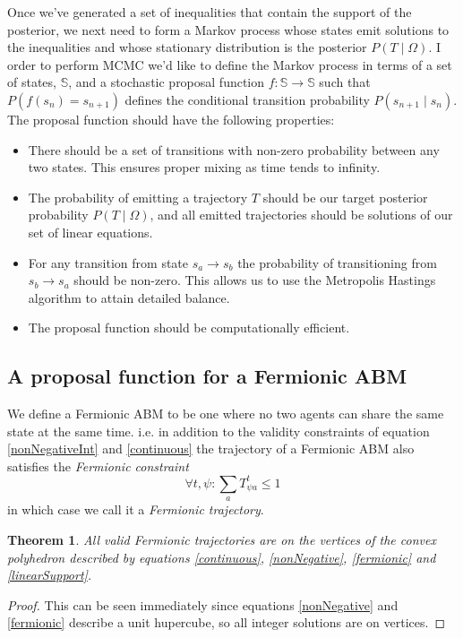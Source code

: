 \documentclass{article}
\newtheorem{theorem}{Theorem}
\begin{document}
Once we've generated a set of inequalities that contain the support of the posterior, we next need to form a Markov process whose states emit solutions to the inequalities and whose stationary distribution is the posterior $P(T \mid \Omega)$. I order to perform MCMC we'd like to define the Markov process in terms of a set of states, $\mathbb{S}$, and a stochastic proposal function $f:\mathbb{S} \to \mathbb{S}$ such that $P(f(s_n) = s_{n+1})$ defines the conditional transition probability $P(s_{n+1} \mid s_n)$. The proposal function should have the following properties:
\begin{itemize}
\item There should be a set of transitions with non-zero probability between any two states. This ensures proper mixing as time tends to infinity.

\item The probability of emitting a trajectory $T$ should be our target posterior probability $P(T \mid \Omega)$, and all emitted trajectories should be solutions of our set of linear equations.

\item For any transition from state $s_a \to s_b$ the probability of transitioning from $s_b \to s_a$ should be non-zero. This allows us to use the Metropolis Hastings algorithm to attain detailed balance.

\item The proposal function should be computationally efficient. 
\end{itemize}

\subsection{A proposal function for a Fermionic ABM}

We define a Fermionic ABM to be one where no two agents can share the same state at the same time. i.e. in addition to the validity constraints of equation \ref{nonNegativeInt} and \ref{continuous} the trajectory of a Fermionic ABM also satisfies the \textit{Fermionic constraint}
\begin{equation}
\forall t,\psi: \sum_a T^t_{\psi a} \le 1
\label{fermionic}
\end{equation}
in which case we call it a \textit{Fermionic trajectory}.

\begin{theorem}
All valid Fermionic trajectories are on the vertices of the convex polyhedron described by equations \ref{continuous}, \ref{nonNegative}, \ref{fermionic} and \ref{linearSupport}.
\end{theorem}
\begin{proof}
This can be seen immediately since equations \ref{nonNegative} and \ref{fermionic} describe a unit hupercube, so all integer solutions are on vertices.
\end{proof}
\end{document}
